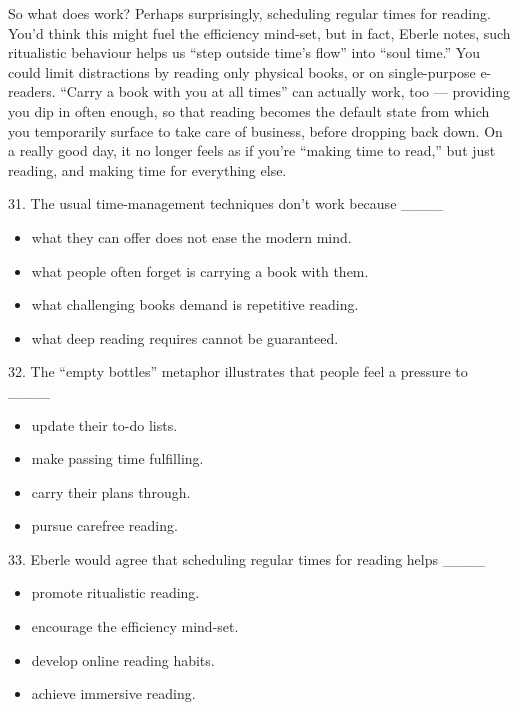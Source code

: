 \documentclass[UTF8,11pt]{ctexart}
\begin{document}
So what does work? Perhaps surprisingly, scheduling regular times for reading. You’d think this might fuel the efficiency mind-set, but in fact, Eberle notes, such ritualistic behaviour helps us “step outside time’s flow” into “soul time.” You could limit distractions by reading only physical books, or on single-purpose e-readers. “Carry a book with you at all times” can actually work, too — providing you dip in often enough, so that reading becomes the default state from which you temporarily surface to take care of business, before dropping back down. On a really good day, it no longer feels as if you’re “making time to read,” but just reading, and making time for everything else.


31. The usual time-management techniques don’t work because \_\_\_\_


\begin{itemize}[leftmargin=2em,itemsep=.2em,topsep=.4em]\item[A.] what they can offer does not ease the modern mind.
\item[B.] what people often forget is carrying a book with them.
\item[C.] what challenging books demand is repetitive reading.
\item[D.] what deep reading requires cannot be guaranteed.
\end{itemize}

32. The “empty bottles” metaphor illustrates that people feel a pressure to \_\_\_\_


\begin{itemize}[leftmargin=2em,itemsep=.2em,topsep=.4em]\item[A.] update their to-do lists.
\item[B.] make passing time fulfilling.
\item[C.] carry their plans through.
\item[D.] pursue carefree reading.
\end{itemize}

33. Eberle would agree that scheduling regular times for reading helps \_\_\_\_


\begin{itemize}[leftmargin=2em,itemsep=.2em,topsep=.4em]\item[A.] promote ritualistic reading.
\item[B.] encourage the efficiency mind-set.
\item[C.] develop online reading habits.
\item[D.] achieve immersive reading.
\end{itemize}
\end{document}

